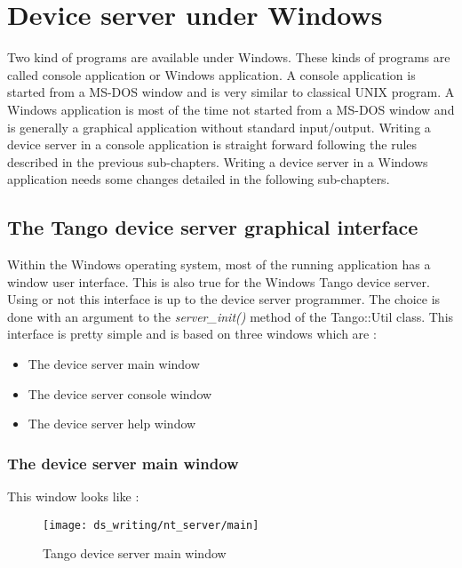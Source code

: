 \section{Device server under Windows}

Two kind of programs are available under Windows.
These kinds of programs are called console application
or Windows application. A console application is started from a MS-DOS
window and is very similar to classical UNIX program. A Windows application
is most of the time not started from a MS-DOS window and is generally
a graphical application without standard input/output. Writing a device
server in a console application is straight forward following the
rules described in the previous sub-chapters. Writing a device server
in a Windows application needs some changes detailed in the following
sub-chapters.


\subsection{The Tango device server graphical interface}

Within the Windows operating system, most of the running application
has a window user interface. This is also true for the Windows Tango
device server. Using or not this interface is up to the device server
programmer. The choice is done with an argument to the \emph{server\_init()}
method of the Tango::Util class. This interface is pretty
simple and is based on three windows which are :
\begin{itemize}
\item The device server main window
\item The device server console window
\item The device server help window
\end{itemize}

\subsubsection{The device server main window}

This window looks like :

\vspace{0.3cm}


\begin{center}
\begin{figure}
\protect\caption{Tango device server main window}


\texttt{[image: ds\_writing/nt\_server/main]}
\end{figure}

\par\end{center}

